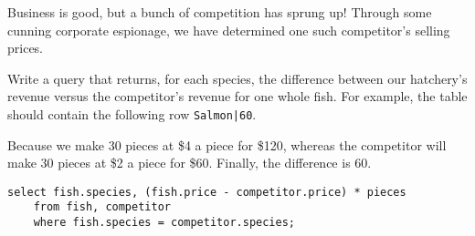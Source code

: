 \begin{blocksection}
\question Business is good, but a bunch of competition has sprung up! Through some cunning corporate espionage, we have determined one such competitor's selling prices.

Write a query that returns, for each species, the difference between our hatchery's revenue versus the competitor's revenue for one whole fish. For example, the table should contain the following row \lstinline$Salmon|60$.

Because we make 30 pieces at \$4 a piece for \$120, whereas the competitor will make 30 pieces at \$2 a piece for \$60. Finally, the difference is 60.

\begin{solution}[1.5in]
\begin{lstlisting}
select fish.species, (fish.price - competitor.price) * pieces
    from fish, competitor
    where fish.species = competitor.species;
\end{lstlisting}
\end{solution}
\end{blocksection}
